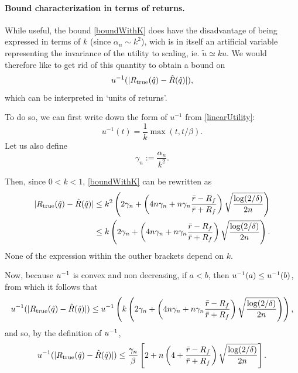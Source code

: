 \paragraph{Bound characterization in terms of returns.}
While useful, the bound \eqref{boundWithK} does have the disadvantage of being expressed
in terms of $k$ (since $\alpha_n \sim k^2$), wich is in itself an artificial variable
representing the invariance of the utility to scaling, ie. $\tilde u \simeq k u$. We would
therefore like to get rid of this quantity to obtain a bound on
\begin{equation*}
  u^{-1}(|R_{\mathrm{true}}(\hat q) - \hat R(\hat q)|),
\end{equation*}
which can be interpreted in `units of returns'. 


To do so, we can first write down the form of $u^{-1}$ from \eqref{linearUtility}:
\begin{equation*}
  u^{-1}(t) = \frac{1}{k}\max(t,t/\beta).
\end{equation*}
Let us also define 
\begin{equation*}
  \gamma_n := \frac{\alpha_n}{k^2}. 
\end{equation*}

Then, since $0<k<1$, \eqref{boundWithK} can be rewritten as
\begin{align}
  |R_{\mathrm{true}}(\hat{q}) - \hat{R}(\hat{q})| &\leq k^2\left(
  2\gamma_n + \left(4n\gamma_n + n\gamma_n\frac{\bar r - R_f}{\bar r +
      R_f}\right) \sqrt{\frac{\log(2/\delta)}{2n}}\right) \nonumber \\
  \label{newKBound}
  &\leq k\left(
  2\gamma_n + \left(4n\gamma_n + n\gamma_n\frac{\bar r - R_f}{\bar r +
      R_f}\right) \sqrt{\frac{\log(2/\delta)}{2n}}\right).
\end{align}
None of the expression within the outher brackets depend on $k$. 

Now, because $u^{-1}$ is convex and non decreasing, if $a<b$, then $u^{-1}(a)\leq u^{-1}(b)$,
from which it follows that
\begin{equation*}
  u^{-1}(|R_{\mathrm{true}}(\hat{q}) - \hat{R}(\hat{q})|) \leq u^{-1}\left(k\left(
  2\gamma_n + \left(4n\gamma_n + n\gamma_n\frac{\bar r - R_f}{\bar r +
      R_f}\right) \sqrt{\frac{\log(2/\delta)}{2n}}\right)\right),
\end{equation*}
and so, by the definition of $u^{-1}$, 
\begin{equation*}
  u^{-1}(|R_{\mathrm{true}}(\hat{q}) - \hat{R}(\hat{q})|) \leq 
  \frac{\gamma_n}{\beta}\left[2+ n\left(4 + \frac{\bar r - R_f}{\bar r +
      R_f}\right) \sqrt{\frac{\log(2/\delta)}{2n}}\right].
\end{equation*}

